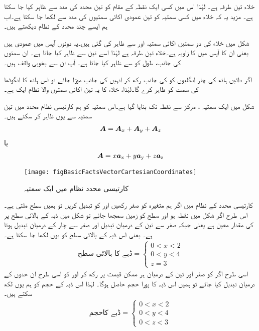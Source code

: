 	 خلاء تین طرفہ ہے۔ لہٰذا اس میں کسی ایک نقطہ کے مقام کو تین محدد کی مدد سے ظاہر کیا جا سکتا ہے۔ مزید یہ کہ خلاء میں کسی سمتیہ کو تین عمودی اکائی سمتیوں کی مدد سے لکھا جا سکتا ہے۔اب ہم ایسے چند محدد کے نظام دیکھتے ہیں۔

	شکل    میں خلاء کی دو سمتیں اکائی سمتیہ  اور  سے ظاہر کی گئی ہیں۔یہ دونوں  آپس میں عمودی ہیں یعنی ان کا آپس میں   کا زاویہ ہے۔خلاء تین طرفہ ہے لہٰذا اسے تین  سے ظاہر کیا جاتا ہے۔ ان سمتوں کی جانب،  طول  کو  سے ظاہر کیا جاتا ہے۔ آپ ان سے بخوبی واقف ہیں۔ 


	 اگر دائیں ہاتھ کی چار انگلیوں کو  کی جانب رکھ کر انہیں  کی جانب موڑا جائے تو اس ہاتھ کا انگوٹھا  کی سمت کو ظاہر کرے گا۔لہٰذا،  خلاء کا  یہ  تین اکائی سمتوں والا نظام ایک   ہے۔

	شکل   میں ایک سمتیہ ، مرکز سے نقطہ  تک بنایا گیا ہے۔اس سمتیہ کو ہم کارتیسی نظام محدد میں تین سمتیہ سے یوں ظاہر کر سکتے ہیں۔
\begin{align}
{\ensuremath{{\boldsymbol{A}}}}={{\boldsymbol{A}}}_x+{{\boldsymbol{A}}}_y+{{\boldsymbol{A}}}_z
\end{align}
یا
\begin{align}
{\ensuremath{{\boldsymbol{A}}}}=x{\boldsymbol{a}}_{\textup{x}}+y{\boldsymbol{a}}_{\textup{y}}+z{\boldsymbol{a}}_{\textup{z}}
\end{align}
%
\begin{figure}
\centering
\texttt{[image: figBasicFactsVectorCartesianCoordinates]}
\caption{کارتیسی محدد نظام میں ایک سمتیہ}
\label{شکل_حقائق_کارتیسی_نظام_ایک_سمتیہ}
\end{figure}
%
کارتیسی محدد کے نظام میں اگر ہم متغیرہ  کو صفر رکھیں اور  کو تبدیل کریں تو ہمیں  سطح  ملتی ہے۔ اس طرح اگر شکل   میں نقطہ  ہو اور  سطح کو زمین سمجھا جائے  تو شکل میں ڈبہ کے بالائی سطح پر   کی مقدار معین ہے یعنی   جبکہ  صفر سے تین کے درمیان تبدیل اور  صفر سے چار کے درمیان تبدیل ہوتا ہے۔ یعنی اس ڈبہ کے بالائی سطح کو یوں لکھا جا سکتا ہے۔ 
\begin{align}
 \text{ڈبے کا بالائی سطح}= \left\{ 
  \begin{array}{l}
    0<x<2\\
    0<y<4 \\
	 z=3
  \end{array} \right.
\end{align}
اسی طرح اگر  کو صفر اور تین کے درمیان ہر ممکن قیمت پر رکھ کر  اور  کو اسی طرح ان حدوں کے درمیان تبدیل کیا جائے تو ہمیں اس ڈبہ کا پورا حجم حاصل ہوگا۔ لہٰذا اس ڈبہ کے حجم کو ہم یوں لکھ سکتے ہیں۔
\begin{align}
 \text{ڈبے کاحجم}= \left\{ 
  \begin{array}{l}
    0<x<2\\
    0<y<4 \\
    0<z<3
  \end{array} \right.
\end{align}

